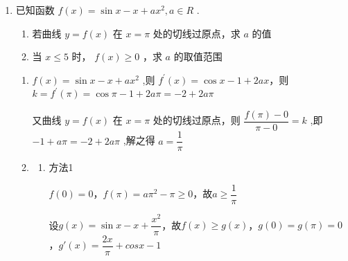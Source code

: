 \begin{enumerate}
    \item 已知函数 $f\left( x\right)  = \sin x - x + a{x}^{2},a \in  {R}$ .
    \begin{enumerate}
        \item 若曲线 $y = f\left( x\right)$ 在 $x = \pi$ 处的切线过原点，求 $a$ 的值
        \item 当 $x \leq  5$ 时， $f\left( x\right)  \geq  0$ ，求 $a$ 的取值范围
    \end{enumerate}
    \begin{jieda}
        \begin{enumerate}
            \item $f\left( x\right)  = \sin x - x + {ax^2}$ ,则 ${f}^{\prime }\left( x\right)  = \cos x - 1 + {2ax}$，则 $k = {f}^{\prime }\left( \pi \right)  = \cos \pi  - 1 + {2a\pi } =  - 2 + {2a\pi }$
            
            又曲线 $y = f\left( x\right)$ 在 $x = \pi$ 处的切线过原点，则 $\dfrac{f\left( \pi \right)  - 0}{\pi  - 0} = k$ ,即 $- 1 + {a\pi } =  - 2 + {2a\pi }$ ,解之得 $a = \dfrac{1}{\pi }$
            
            \item 
            \begin{enumerate}
                \item 方法1

                $f(0) = 0$，$f\left(\pi\right) = a\pi^2-\pi \geq 0$，故$a \geq \dfrac{1}{\pi}$
    
                设$g(x) = \sin x - x + \dfrac{x^2}{\pi}$，故$f(x) \geq g(x)$，$g(0) = g(\pi) = 0$，$g'(x) = \dfrac{2x}{\pi}+cosx-1$
                
\end{enumerate}
\end{enumerate}
\end{jieda}
\end{enumerate}
